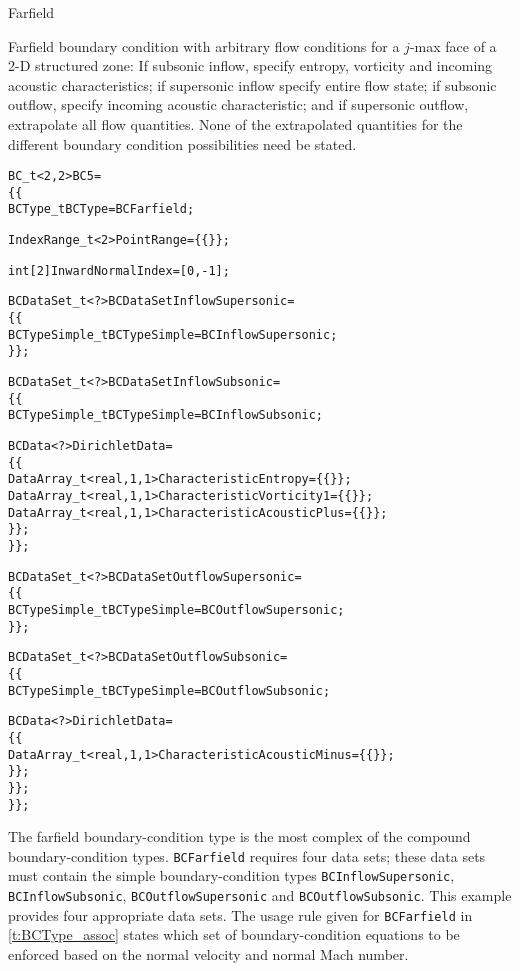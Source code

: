 \begin{example}{Farfield}
\label{ex:bc5}

Farfield boundary condition with arbitrary flow conditions for a $j$-max
face of a 2-D structured zone: If subsonic inflow, specify entropy,
vorticity and incoming acoustic characteristics; if supersonic inflow
specify entire flow state; if subsonic outflow, specify incoming
acoustic characteristic; and if supersonic outflow, extrapolate all
flow quantities.
None of the extrapolated quantities for the different boundary condition
possibilities need be stated.
\begin{alltt}
  BC\_t<2,2> BC5 =
    \{\{
    BCType\_t BCType = BCFarfield ;

    IndexRange\_t<2> PointRange = \{\{ \}\} ;

    int[2] InwardNormalIndex = [0,-1] ;

    BCDataSet\_t<?> BCDataSetInflowSupersonic =
      \{\{
      BCTypeSimple\_t BCTypeSimple = BCInflowSupersonic ;
      \}\} ;

    BCDataSet\_t<?> BCDataSetInflowSubsonic =
      \{\{
      BCTypeSimple\_t BCTypeSimple = BCInflowSubsonic ;

      BCData<?> DirichletData = 
        \{\{
        DataArray\_t<real, 1, 1> CharacteristicEntropy      = \{\{ \}\} ;
        DataArray\_t<real, 1, 1> CharacteristicVorticity1   = \{\{ \}\} ;
        DataArray\_t<real, 1, 1> CharacteristicAcousticPlus = \{\{ \}\} ;
        \}\} ;
      \}\} ;

    BCDataSet\_t<?> BCDataSetOutflowSupersonic =
      \{\{
      BCTypeSimple\_t BCTypeSimple = BCOutflowSupersonic ;
      \}\} ;

    BCDataSet\_t<?> BCDataSetOutflowSubsonic =
      \{\{
      BCTypeSimple\_t BCTypeSimple = BCOutflowSubsonic ;

      BCData<?> DirichletData = 
        \{\{
        DataArray\_t<real, 1, 1> CharacteristicAcousticMinus = \{\{ \}\} ;
        \}\} ;
      \}\} ;
    \}\} ;
\end{alltt}
The farfield boundary-condition type is the most complex of the compound
boundary-condition types.
\texttt{BCFarfield} requires four data sets; these data sets must
contain the simple boundary-condition types \texttt{BCInflowSupersonic},
\texttt{BCInflowSubsonic}, \texttt{BCOutflowSupersonic} and
\texttt{BCOutflowSubsonic}.
This example provides four appropriate data sets.
The usage rule given for \texttt{BCFarfield} in \autoref{t:BCType_assoc}
states which set of boundary-condition equations to be enforced based on
the normal velocity and normal Mach number.


\end{example}
